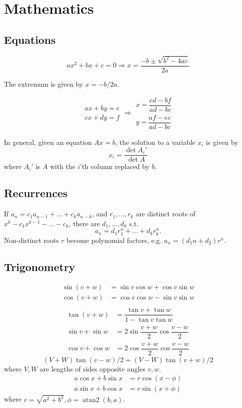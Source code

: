 
\section{Mathematics}

\subsection{Equations}
\[ax^2+bx+c=0 \Rightarrow x = \frac{-b\pm\sqrt{b^2-4ac}}{2a}\]

The extremum is given by $x = -b/2a$.

\[\begin{aligned}ax+by=e\\cx+dy=f\end{aligned}
\Rightarrow
\begin{aligned}x=\dfrac{ed-bf}{ad-bc}\\y=\dfrac{af-ec}{ad-bc}\end{aligned}\]

In general, given an equation $Ax = b$, the solution to a variable $x_i$ is given by
\[x_i = \frac{\det A_i'}{\det A} \]
where $A_i'$ is $A$ with the $i$'th column replaced by $b$.

\subsection{Recurrences}
If $a_n = c_1 a_{n-1} + \dots + c_k a_{n-k}$, and $r_1, \dots, r_k$ are distinct roots of $x^k - c_1 x^{k-1} - \dots - c_k$, there are $d_1, \dots, d_k$ s.t.
\[a_n = d_1r_1^n + \dots + d_kr_k^n. \]
Non-distinct roots $r$ become polynomial factors, e.g. $a_n = (d_1n + d_2)r^n$.

\subsection{Trigonometry}
\begin{align*}
\sin(v+w)&{}=\sin v\cos w+\cos v\sin w\\
\cos(v+w)&{}=\cos v\cos w-\sin v\sin w\\
\end{align*}
\begin{align*}
\tan(v+w)&{}=\dfrac{\tan v+\tan w}{1-\tan v\tan w}\\
\sin v+\sin w&{}=2\sin\dfrac{v+w}{2}\cos\dfrac{v-w}{2}\\
\cos v+\cos w&{}=2\cos\dfrac{v+w}{2}\cos\dfrac{v-w}{2}
\end{align*}
\[ (V+W)\tan(v-w)/2{}=(V-W)\tan(v+w)/2 \]
where $V, W$ are lengths of sides opposite angles $v, w$.
\begin{align*}
	a\cos x+b\sin x&=r\cos(x-\phi)\\
	a\sin x+b\cos x&=r\sin(x+\phi)
\end{align*}
where $r=\sqrt{a^2+b^2}, \phi=\operatorname{atan2}(b,a)$.

